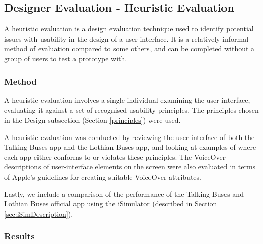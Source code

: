 \documentclass[10pt,twocolumn]{article}
\begin{document}
\subsection{Designer Evaluation - Heuristic Evaluation}
A heuristic evaluation is a design evaluation technique used to identify potential issues with usability in the design of a user interface. It is a relatively informal method of evaluation compared to some others, and can be completed without a group of users to test a prototype with.

\subsubsection{Method}
\label{sec:iSimEval}
A heuristic evaluation involves a single individual examining the user interface, evaluating it against a set of recognised usability principles. The principles chosen in the Design subsection (Section \ref{principles}) were used.

A heuristic evaluation was conducted by reviewing the user interface of both the Talking Buses app and the Lothian Buses app, and looking at examples of where each app either conforms to or violates these principles. The VoiceOver descriptions of user-interface elements on the screen were also evaluated in terms of Apple's guidelines for creating suitable VoiceOver attributes.

Lastly, we include a comparison of the performance of the Talking Buses and Lothian Buses official app using the iSimulator (described in Section \ref{sec:iSimDescription}).

\subsubsection{Results}
\end{document}
